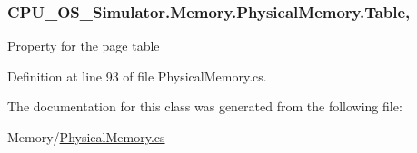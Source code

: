 \subsubsection[{Table}]{ C\+P\+U\+\_\+\+O\+S\+\_\+\+Simulator.\+Memory.\+Physical\+Memory.\+Table\hspace{0.3cm}{\ttfamily [get]}, {\ttfamily [set]}}\label{class_c_p_u___o_s___simulator_1_1_memory_1_1_physical_memory_aaa669f8a92820bf792dd2ccb553254c9}


Property for the page table 



Definition at line 93 of file Physical\+Memory.\+cs.



The documentation for this class was generated from the following file\+:\begin{DoxyCompactItemize}
\item 
Memory/\hyperlink{_physical_memory_8cs}{Physical\+Memory.\+cs}\end{DoxyCompactItemize}

